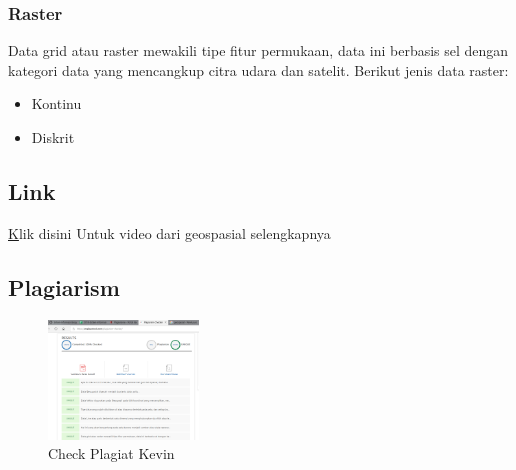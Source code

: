 \subsubsection{Raster}
Data grid atau raster mewakili tipe fitur permukaan, data ini berbasis sel dengan kategori data yang mencangkup citra udara dan satelit. Berikut jenis data raster:
\begin {itemize}
	\item Kontinu
	\item Diskrit
\end {itemize}

 
\subsection{Link}
\href {} Klik disini Untuk video dari geospasial selengkapnya
\subsection{Plagiarism}
\begin{figure}[H]
	\includegraphics[width=4cm]{figures/1174059/plagiarisme.png}
	\centering
	\caption{Check Plagiat Kevin}
\end{figure}

